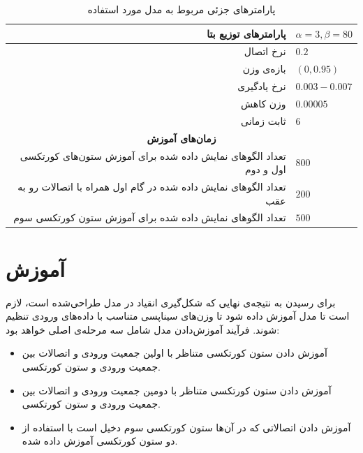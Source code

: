 \documentclass[12pt]{report}
\begin{document}
\begin{table}[p]
{\begin{tabular}{|rrrl|}
		\multicolumn{3}{|r|}{پارامتر‌های توزیع بتا}                                               & $\alpha=3, \beta=80$           \\ \hline
		\multicolumn{3}{|r|}{نرخ اتصال}                                                           & $0.2$                 \\ \hline
		\multicolumn{3}{|r|}{بازه‌ی وزن}                                                          & $(0, 0.95)$           \\ \hline
		\multicolumn{3}{|r|}{نرخ یادگیری}                                                         & $0.003 - 0.007$       \\ \hline
		\multicolumn{3}{|r|}{وزن کاهش}                                                            & $0.00005$             \\ \hline
		\multicolumn{3}{|r|}{ثابت زمانی}                                                          & $6$                   \\ \hline
		\multicolumn{4}{|c|}{\textbf{زمان‌های آموزش}}                                                                   \\ \hline
		\multicolumn{3}{|r|}{تعداد الگو‌های نمایش داده شده برای آموزش ستون‌های کورتکسی اول و دوم} & $800$                \\ \hline
		\multicolumn{3}{|r|}{تعداد الگو‌های نمایش داده شده در گام اول همراه با اتصالات رو به عقب} & $200$                \\ \hline
		\multicolumn{3}{|r|}{تعداد الگو‌های نمایش داده شده برای آموزش ستون کورتکسی سوم}           & $500$                 \\ \hline
\end{tabular}}
\caption{\label{table:parameters-details}پارامتر‌های جزئی مربوط به مدل مورد استفاده}
\end{table}





	
	\section{آموزش}
	برای رسیدن به نتیجه‌ی نهایی که شکل‌گیری انقیاد در مدل طراحی‌شده‌ است، لازم است تا مدل آموزش داده شود تا وزن‌های سیناپسی متناسب با داده‌های ورودی تنظیم شوند. 
	فرآیند آموزش‌دادن مدل شامل سه مرحله‌ی اصلی خواهد بود:
	
	\begin{itemize}
		\item آموزش دادن ستون کورتکسی متناظر با اولین جمعیت ورودی و اتصالات بین جمعیت ورودی و ستون کورتکسی.
		\item آموزش دادن ستون کورتکسی متناظر با دومین جمعیت ورودی و اتصالات بین جمعیت ورودی و ستون کورتکسی.
		\item آموزش دادن اتصالاتی که در آن‌ها ستون کورتکسی سوم دخیل است با استفاده از دو ستون کورتکسی آموزش داده شده.
	\end{itemize}
\end{document}
